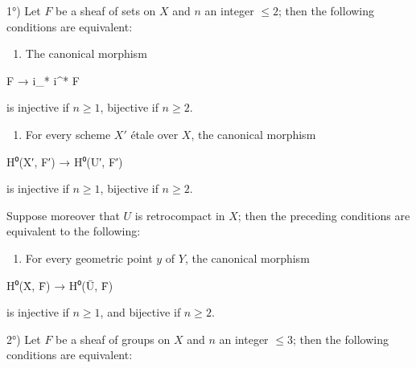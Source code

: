 \documentclass[
  11pt,
  a4paper,
]{book}
\newenvironment{Shaded}{}{}
\newcommand{\NormalTok}[1]{#1}
\providecommand{\tightlist}{%
  \setlength{\itemsep}{0pt}\setlength{\parskip}{0pt}}
\begin{document}
1°) Let \(F\) be a sheaf of sets on \(X\) and \(n\) an integer
\(\leqslant 2\); then the following conditions are equivalent:

\begin{enumerate}
\def\labelenumi{(\roman{enumi})}
\tightlist
\item
  The canonical morphism
\end{enumerate}

\begin{Shaded}
\begin{Highlighting}[]
\NormalTok{F → i\_* i\^{}* F}
\end{Highlighting}
\end{Shaded}

is injective if \(n \geqslant 1\), bijective if \(n \geqslant 2\).

\begin{enumerate}
\def\labelenumi{(\roman{enumi})}
\setcounter{enumi}{1}
\tightlist
\item
  For every scheme \(X'\) étale over \(X\), the canonical morphism
\end{enumerate}

\begin{Shaded}
\begin{Highlighting}[]
\NormalTok{H⁰(X′, F′) → H⁰(U′, F′)}
\end{Highlighting}
\end{Shaded}

is injective if \(n \geqslant 1\), bijective if \(n \geqslant 2\).

Suppose moreover that \(U\) is retrocompact in \(X\); then the preceding
conditions are equivalent to the following:

\begin{enumerate}
\def\labelenumi{(\roman{enumi})}
\setcounter{enumi}{2}
\tightlist
\item
  For every geometric point \(y\) of \(Y\), the canonical morphism
\end{enumerate}

\begin{Shaded}
\begin{Highlighting}[]
\NormalTok{H⁰(X̄, F̄) → H⁰(Ū, F̄)}
\end{Highlighting}
\end{Shaded}

is injective if \(n \geqslant 1\), and bijective if \(n \geqslant 2\).

2°) Let \(F\) be a sheaf of groups on \(X\) and \(n\) an integer
\(\leqslant 3\); then the following conditions are equivalent:
\end{document}
